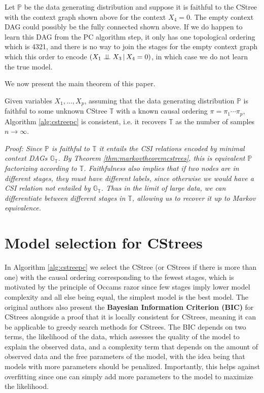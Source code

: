 \documentclass{tufte-book}
\begin{document}
Let \(\mathbb{P}\) be the data generating distribution and suppose it is faithful to the CStree with the context graph shown above for the context \(X_4=0\). The empty context DAG could possibly be the fully connected shown above. If we do happen to learn this DAG from the PC algorithm step, it only has one topological ordering which is 4321, and there is no way to join the stages for the empty context graph which this order to encode \((X_1 \perp \!\!\! \perp X_3 \,|\,X_4=0)\), in which case we do not learn the true model.


We now present the main theorem of this paper.


\begin{theorem}\label{thm:cstreepccorrectness}
Given variables $X_1,...,X_p$, assuming that the data generating distribution $\mathbb{P}$ is faithful to some unknown CStree $\mathbb{T}$ with a known causal ordering $\pi = \pi_1 \cdots \pi_p$, Algorithm \ref{alg:cstreepc} is consistent, i.e. it recovers $\mathbb{T}$ as the number of samples $n \rightarrow \infty$.
\end{theorem}


\textit{Proof:
Since $\mathbb{P}$ is faithful to $\mathbb{T}$ it entails the CSI relations encoded by minimal context DAGs $\mathbb{G}_{\mathbb{T}}$. By Theorem \ref{thm:markovtheoremcstrees}, this is equivalent $\mathbb{P}$ factorizing according to $\mathbb{T}$. Faithfulness also implies that if two nodes are in different stages, they must have different labels, since otherwise we would have a CSI relation not entailed by $\mathbb{G}_{\mathbb{T}}$. Thus in the limit of large data, we can differentiate between different stages in $\mathbb{T}$, allowing us to recover it up to Markov equivalence.
}

\section{Model selection for CStrees}
\label{sec:org46d6502}
In Algorithm \ref{alg:cstreepc} we select the CStree (or CStrees if there is more than one) with the causal ordering corresponding to the fewest stages, which is motivated by the principle of Occams razor \cite{pearl-2009-causal} since few stages imply lower model complexity and all else being equal, the simplest model is the best model. The original authors also present the \textbf{Bayesian Information Criterion (BIC)} for CStrees alongside a proof that it is locally consistent for CStrees, meaning it can be applicable to greedy search methods for CStrees. The BIC depends on two terms, the likelihood of the data, which assesses the quality of the model to explain the observed data, and a complexity term that depends on the amount of observed data and the free parameters of the model, with the idea being that models with more parameters should be penalized. Importantly, this helps against overfitting since one can simply add more parameters to the model to maximize the likelihood.
\end{document}
